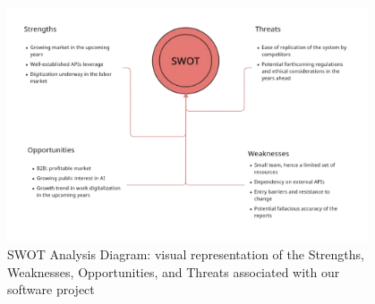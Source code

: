 \documentclass{article}
\begin{document}
\begin{figure}[h]
  \centering
  \includegraphics[width=0.95\textwidth]{images/swat_cropped.png}
  \caption{\small SWOT Analysis Diagram: visual representation of the Strengths, Weaknesses, Opportunities, and Threats associated with our software project}
\end{figure}
\end{document}
